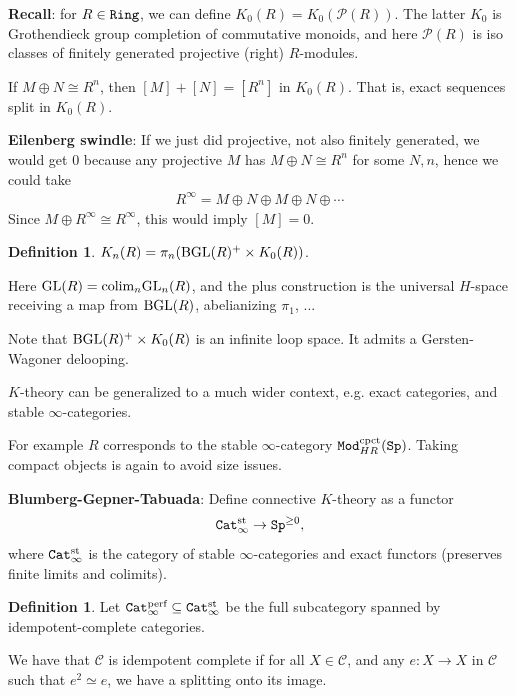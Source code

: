 \documentclass[12pt]{amsart}
\theoremstyle{definition}
\newtheorem{definition}[theorem]{Definition}
\providecommand{\Sp}{\texttt{Sp}}
\providecommand{\Sp}{\text{Sp}}
\providecommand{\st}{\text{st}}
\begin{document}
\textbf{Recall}: for $R\in\texttt{Ring}$, we can define $K_0(R) = K_0(\mathcal{P}(R))$. The latter $K_0$ is Grothendieck group completion of commutative monoids, and here $\mathcal{P}(R)$ is iso classes of finitely generated projective (right) $R$-modules.

If $M \oplus N \cong R^n$, then $[M] + [N] = [R^n]$ in $K_0(R)$. That is, exact sequences split in $K_0(R)$.

\textbf{Eilenberg swindle}: If we just did projective, not also finitely generated, we would get 0 because any projective $M$ has $M \oplus N \cong R^n$ for some $N,n$, hence we could take
\begin{align*}
    R^\infty = M \oplus N \oplus M \oplus N \oplus \cdots
\end{align*}
Since $M \oplus R^\infty \cong R^\infty$, this would imply $[M]=0$.

\begin{definition} $K_n(R) = \pi_n(\text{BGL}(R)^+ \times K_0(R))$.
\end{definition}

Here $\text{GL}(R) = \text{colim}_n \text{GL}_n(R)$, and the plus construction is the universal $H$-space receiving a map from $\text{BGL}(R)$, abelianizing $\pi_1$, ...

Note that $\text{BGL}(R)^+ \times K_0(R)$ is an infinite loop space. It admits a Gersten-Wagoner delooping.

$K$-theory can be generalized to a much wider context, e.g. exact categories, and stable $\infty$-categories.

For example $R$ corresponds to the stable $\infty$-category $\Mod_{HR}^\text{cpct}(\Sp)$. Taking compact objects is again to avoid size issues.

\textbf{Blumberg-Gepner-Tabuada}: Define connective $K$-theory as a functor
\begin{align*}
    \Cat_\infty^\st \to \Sp^{\ge 0},
\end{align*}
where $\Cat_\infty^\st$ is the category of stable $\infty$-categories and exact functors (preserves finite limits and colimits).

\begin{definition} Let $\Cat_\infty^\perf \subseteq \Cat_\infty^\st$ be the full subcategory spanned by idempotent-complete categories.
\end{definition}

We have that $\mathscr{C}$ is idempotent complete if for all $X\in \mathscr{C}$, and any $e: X \to X$ in $\mathscr{C}$ such that $e^2 \simeq e$, we have a splitting onto its image.
\end{document}
